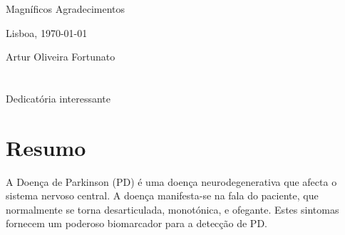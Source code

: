
Magníficos Agradecimentos

\vfill
\begin{flushright}
  \begin{minipage}{8cm}
    \begin{center}
      Lisboa, \today

      Artur Oliveira Fortunato
    \end{center}
  \end{minipage}
\end{flushright}

\cleardoublepage


\chapter*{}
\thispagestyle{empty}

\vfill
\mbox{}
\vfill\Large
\begin{flushright}
  \begin{minipage}{8cm}
    \begin{center}

Dedicatória interessante

    \end{center}
  \end{minipage}
\end{flushright}
\normalsize\vfill

\cleardoublepage


\chapter*{Resumo}
\thispagestyle{empty}

A Doença de Parkinson (PD) é uma doença neurodegenerativa que afecta o sistema nervoso central. A doença manifesta-se na fala do paciente, que normalmente se torna desarticulada, monotónica, e ofegante. Estes sintomas fornecem um poderoso biomarcador para a detecção de PD.

